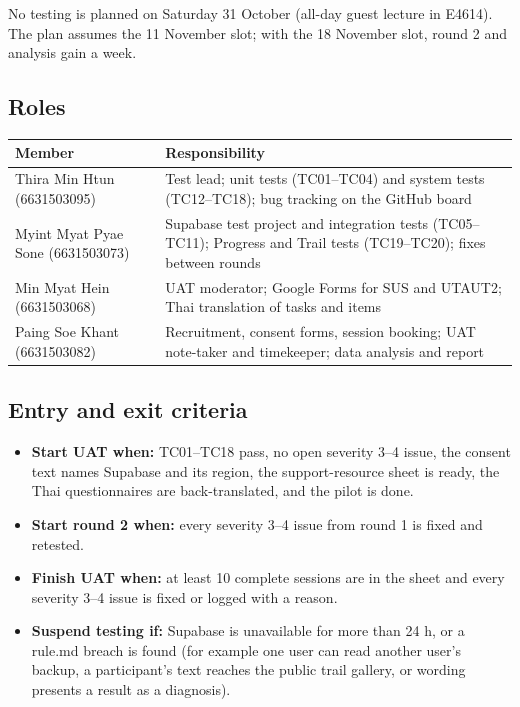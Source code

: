 \documentclass{article}
\begin{document}
No testing is planned on Saturday 31 October (all-day guest lecture in E4614). The plan assumes the 11 November slot; with the 18 November slot, round 2 and analysis gain a week.

\subsection{Roles}

\begin{center}
\small
\begin{tabularx}{\linewidth}{|L{5.2cm}|Y|}
\hline
\textbf{Member} & \textbf{Responsibility} \\ \hline
Thira Min Htun (6631503095) & Test lead; unit tests (TC01--TC04) and system tests (TC12--TC18); bug tracking on the GitHub board \\ \hline
Myint Myat Pyae Sone (6631503073) & Supabase test project and integration tests (TC05--TC11); Progress and Trail tests (TC19--TC20); fixes between rounds \\ \hline
Min Myat Hein (6631503068) & UAT moderator; Google Forms for SUS and UTAUT2; Thai translation of tasks and items \\ \hline
Paing Soe Khant (6631503082) & Recruitment, consent forms, session booking; UAT note-taker and timekeeper; data analysis and report \\ \hline
\end{tabularx}
\end{center}

\subsection{Entry and exit criteria}

\begin{itemize}
\item \textbf{Start UAT when:} TC01--TC18 pass, no open severity 3--4 issue, the consent text names Supabase and its region, the support-resource sheet is ready, the Thai questionnaires are back-translated, and the pilot is done.
\item \textbf{Start round 2 when:} every severity 3--4 issue from round 1 is fixed and retested.
\item \textbf{Finish UAT when:} at least 10 complete sessions are in the sheet and every severity 3--4 issue is fixed or logged with a reason.
\item \textbf{Suspend testing if:} Supabase is unavailable for more than 24 h, or a rule.md breach is found (for example one user can read another user's backup, a participant's text reaches the public trail gallery, or wording presents a result as a diagnosis).
\end{itemize}
\end{document}
